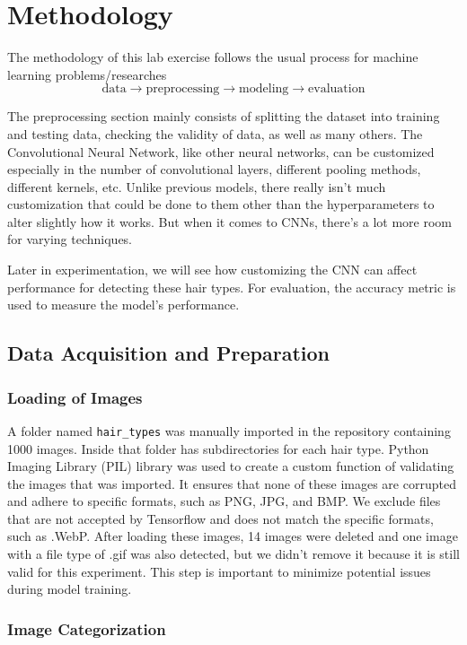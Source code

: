 \section{Methodology}

The methodology of this lab exercise follows the usual process for machine learning problems/researches
\[
  \text{data} \to \text{preprocessing} \to \text{modeling} \to \text{evaluation}
\]

The preprocessing section mainly consists of splitting the dataset into training and testing data, checking the validity of data, as well as many others. The Convolutional Neural Network, like other neural networks, can be customized especially in the number of convolutional layers, different pooling methods, different kernels, etc. Unlike previous models, there really isn't much customization that could be done to them other than the hyperparameters to alter slightly how it works. But when it comes to CNNs, there's a lot more room for varying techniques. 

Later in experimentation, we will see how customizing the CNN can affect performance for detecting these hair types. For evaluation, the accuracy metric is used to measure the model's performance. 

\subsection{Data Acquisition and Preparation}

\subsubsection{Loading of Images}

A folder named \texttt{hair\_types} was manually imported in the repository containing 1000 images. Inside that folder has subdirectories for each hair type. Python Imaging Library (PIL) library was used to create a custom function of validating the images that was imported. It ensures that none of these images are corrupted and adhere to specific formats, such as PNG, JPG, and BMP. We exclude files that are not accepted by Tensorflow and does not match the specific formats, such as .WebP. After loading these images, 14 images were deleted and one image with a file type of .gif was also detected, but we didn't remove it because it is still valid for this experiment. This step is important to minimize potential issues during model training.

\subsubsection{Image Categorization}

